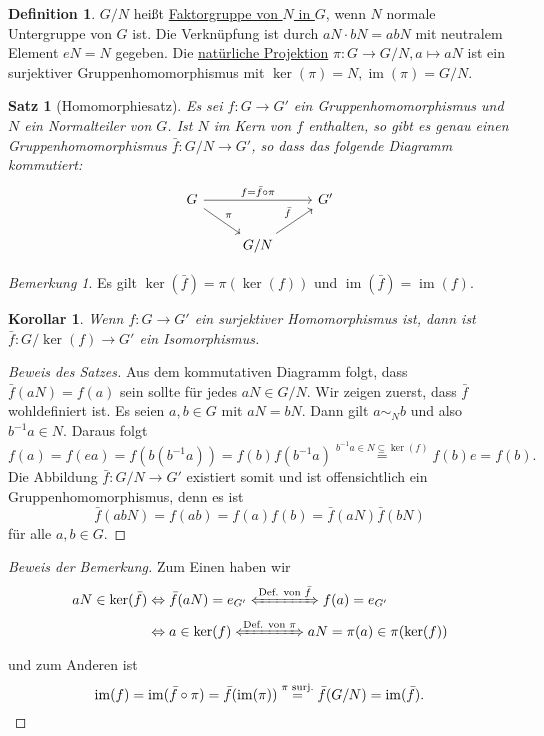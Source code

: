 \documentclass[12pt]{scrartcl} %
\DeclareMathOperator{\im}{im}
\newtheorem{thm}{Satz}
\newtheorem{kor}{Korollar}
\theoremstyle{definition}
\newtheorem*{defn}{Definition}
\theoremstyle{remark}
\newtheorem*{nb}{Bemerkung}
\begin{document}
\begin{defn}
	$G/N$ heißt \underline{Faktorgruppe von $N$ in $G$}, wenn $N$ normale Untergruppe von $G$ ist.
	Die Verknüpfung ist durch $aN \cdot bN = abN$ mit neutralem Element $eN = N$ gegeben.
	Die \underline{natürliche Projektion} $\pi : G \rightarrow G/N, a \mapsto aN$ ist ein surjektiver Gruppenhomomorphismus mit $\ker(\pi) = N, \im(\pi) = G/N$.
\end{defn}

\begin{thm}[Homomorphiesatz]
	Es sei $f: G \rightarrow G'$ ein Gruppenhomomorphismus und \(N\) ein Normalteiler von \(G\).
	Ist \(N\) im Kern von \(f\) enthalten, so gibt es genau einen Gruppenhomomorphismus $\bar{f}: G/N \rightarrow G'$, so dass das folgende Diagramm kommutiert:
	\[\begin{tikzcd}
		G \arrow[rd,"\pi"] \arrow[rr,"f=\bar f\circ \pi"] & & G'\\
		& G/N \arrow[ru,"\bar f"] &
	\end{tikzcd}\]
\end{thm}

\begin{nb}
	Es gilt $\ker(\bar{f}) = \pi(\ker(f))$ und $\im(\bar{f}) = \im(f)$. 
\end{nb}

\begin{kor}
	Wenn $f: G \rightarrow G'$ ein surjektiver Homomorphismus ist, dann ist $\bar{f}: G/\ker(f) \rightarrow G'$ ein Isomorphismus.
\end{kor}

\begin{proof}[Beweis des Satzes]
	Aus dem kommutativen Diagramm folgt, dass $\bar{f}(aN) = f(a)$ sein sollte für jedes $aN \in G/N$.
	Wir zeigen zuerst, dass $\bar{f}$ wohldefiniert ist.
	Es seien $a, b \in G$ mit $aN = bN$.
	Dann gilt $a \sim_{N} b$ und also $b^{-1}a \in N$.
	Daraus folgt $$f(a) = f(ea) = f(b(b^{-1}a)) = f(b) f(b^{-1}a) \stackrel{b^{-1}a \in N \subseteq \ker(f)}{=} f(b)e = f(b).$$
	Die Abbildung $\bar{f}: G/N \rightarrow G'$ existiert somit und ist offensichtlich ein Gruppenhomomorphismus, denn es ist
	$$\bar{f}(abN) = f(ab) = f(a)f(b) = \bar{f}(aN)\bar{f}(bN)$$ für alle $a, b \in G$.
\end{proof}

\begin{proof}[Beweis der Bemerkung]
	Zum Einen haben wir
	\begin{align*}
		aN \in \ker(\bar{f}) &\Leftrightarrow \bar f(aN) = e_{G'} \xLeftrightarrow{\text{Def. von \(\bar{f}\)}} f(a) = e_{G'}\\
		&\Leftrightarrow a \in \ker(f) \xLeftrightarrow{\text{Def. von \(\pi\)}} aN = \pi(a) \in \pi(\ker(f))
	\end{align*}
	und zum Anderen ist
	\[\im(f) = \im(\bar{f} \circ \pi) = \bar{f}(\im(\pi)) \stackrel{\text{\(\pi\) surj.}}{=} \bar{f}(G/N) = \im(\bar{f}).\qedhere\]
\end{proof}
\end{document}
